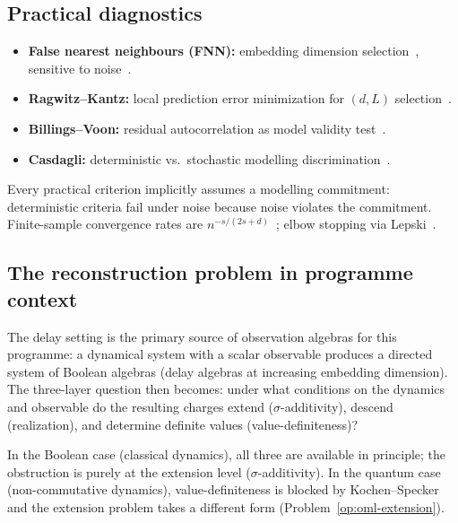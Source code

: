 \subsection{Practical diagnostics}

\begin{itemize}[nosep]
  \item \textbf{False nearest neighbours (FNN):}
    embedding dimension selection~\cite{KennelBrownAbarbanel1992},
    sensitive to noise~\cite{RhodesMorari1997}.

  \item \textbf{Ragwitz--Kantz:} local prediction error minimization
    for $(d, L)$ selection~\cite{RagwitzKantz2002}.

  \item \textbf{Billings--Voon:} residual autocorrelation as
    model validity test~\cite{BillingsVoon1986}.

  \item \textbf{Casdagli:} deterministic vs.\ stochastic modelling
    discrimination~\cite{Casdagli1992}.
\end{itemize}

Every practical criterion implicitly assumes a modelling commitment:
deterministic criteria fail under noise because noise violates the
commitment.  Finite-sample convergence rates are
$n^{-s/(2s+d)}$~\cite{Stone1982}; elbow stopping via
Lepski~\cite{Lepski1991}.

\subsection{The reconstruction problem in programme context}

The delay setting is the primary source of observation algebras for
this programme: a dynamical system with a scalar observable produces
a directed system of Boolean algebras (delay algebras at increasing
embedding dimension).  The three-layer question then becomes: under
what conditions on the dynamics and observable do the resulting
charges extend ($\sigma$-additivity), descend (realization), and
determine definite values (value-definiteness)?

In the Boolean case (classical dynamics), all three are available in
principle; the obstruction is purely at the extension level
($\sigma$-additivity).  In the quantum case (non-commutative
dynamics), value-definiteness is blocked by Kochen--Specker and the
extension problem takes a different form
(Problem~\ref{op:oml-extension}).

